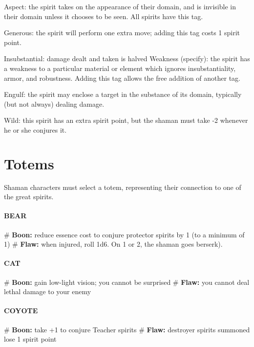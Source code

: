 Aspect: the spirit takes on the appearance of their domain, and is invisible in their domain unless it chooses to be seen. All spirits have this tag.

Generous: the spirit will perform one extra move; adding this tag costs 1 spirit point.

Insubstantial: damage dealt and taken is halved Weakness (specify): the spirit has a weakness to a particular material or element which ignores insubstantiality, armor, and robustness. Adding this tag allows the free addition of another tag.

Engulf: the spirit may enclose a target in the substance of its domain, typically (but not always) dealing damage.

Wild: this spirit has an extra spirit point, but the shaman must take -2 whenever he or she conjures it.



\section{Totems}

Shaman characters must select a totem, representing their connection to one of the great spirits.
\paragraph{BEAR}
    \begin{easylist}
        # \textbf{Boon:} reduce essence cost to conjure protector spirits by 1 (to a minimum of 1)
        # \textbf{Flaw:} when injured, roll 1d6. On 1 or 2, the shaman goes berserk).
    \end{easylist}

\paragraph{CAT}
    \begin{easylist}
        # \textbf{Boon:} gain low-light vision; you cannot be surprised
        # \textbf{Flaw:} you cannot deal lethal damage to your enemy
    \end{easylist}

\paragraph{COYOTE}
    \begin{easylist}
        # \textbf{Boon:} take +1 to conjure Teacher spirits
        # \textbf{Flaw:} destroyer spirits summoned lose 1 spirit point
    \end{easylist}

